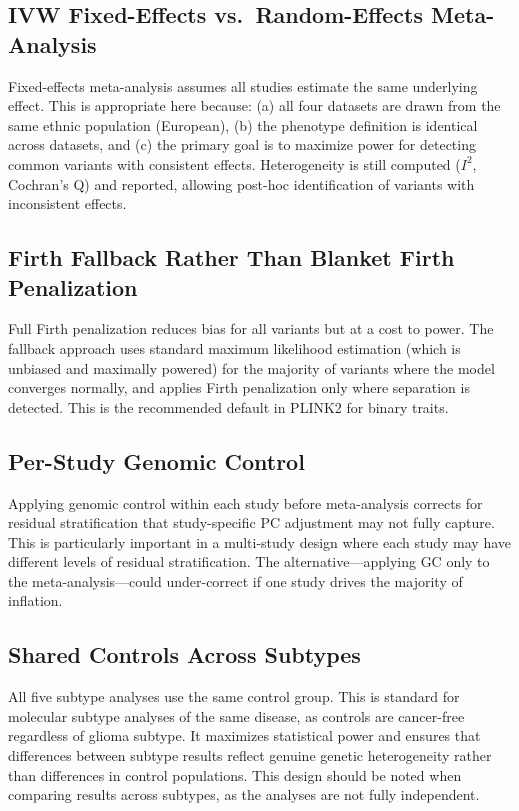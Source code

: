 \documentclass[11pt,letterpaper]{article}
\begin{document}
\subsection{IVW Fixed-Effects vs.\ Random-Effects Meta-Analysis}

Fixed-effects meta-analysis assumes all studies estimate the same underlying effect. This is appropriate here because: (a) all four datasets are drawn from the same ethnic population (European), (b) the phenotype definition is identical across datasets, and (c) the primary goal is to maximize power for detecting common variants with consistent effects. Heterogeneity is still computed ($I^2$, Cochran's Q) and reported, allowing post-hoc identification of variants with inconsistent effects.

\subsection{Firth Fallback Rather Than Blanket Firth Penalization}

Full Firth penalization reduces bias for all variants but at a cost to power. The fallback approach uses standard maximum likelihood estimation (which is unbiased and maximally powered) for the majority of variants where the model converges normally, and applies Firth penalization only where separation is detected. This is the recommended default in PLINK2 for binary traits.

\subsection{Per-Study Genomic Control}

Applying genomic control within each study before meta-analysis corrects for residual stratification that study-specific PC adjustment may not fully capture. This is particularly important in a multi-study design where each study may have different levels of residual stratification. The alternative---applying GC only to the meta-analysis---could under-correct if one study drives the majority of inflation.

\subsection{Shared Controls Across Subtypes}

All five subtype analyses use the same control group. This is standard for molecular subtype analyses of the same disease, as controls are cancer-free regardless of glioma subtype. It maximizes statistical power and ensures that differences between subtype results reflect genuine genetic heterogeneity rather than differences in control populations. This design should be noted when comparing results across subtypes, as the analyses are not fully independent.
\end{document}
